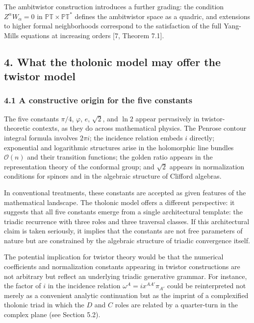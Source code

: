 \documentclass[
  11pt,
  letterpaper,
]{article}
\begin{document}
The ambitwistor construction introduces a further grading: the condition
\(Z^\alpha W_\alpha = 0\) in \(\mathbb{PT} \times \mathbb{PT}^*\)
defines the ambitwistor space as a quadric, and extensions to higher
formal neighborhoods correspond to the satisfaction of the full
Yang-Mills equations at increasing orders {[}7, Theorem 7.1{]}.

\subsection{4. What the tholonic model may offer the twistor
model}\label{what-the-tholonic-model-may-offer-the-twistor-model}

\subsubsection{4.1 A constructive origin for the five
constants}\label{a-constructive-origin-for-the-five-constants}

The five constants \(\pi/4\), \(\varphi\), \(e\), \(\sqrt{2}\), and
\(\ln 2\) appear pervasively in twistor-theoretic contexts, as they do
across mathematical physics. The Penrose contour integral formula
involves \(2\pi i\); the incidence relation embeds \(i\) directly;
exponential and logarithmic structures arise in the holomorphic line
bundles \(\mathcal{O}(n)\) and their transition functions; the golden
ratio appears in the representation theory of the conformal group; and
\(\sqrt{2}\) appears in normalization conditions for spinors and in the
algebraic structure of Clifford algebras.

In conventional treatments, these constants are accepted as given
features of the mathematical landscape. The tholonic model offers a
different perspective: it suggests that all five constants emerge from a
single architectural template: the triadic recurrence with three roles
and three traversal classes. If this architectural claim is taken
seriously, it implies that the constants are not free parameters of
nature but are constrained by the algebraic structure of triadic
convergence itself.

The potential implication for twistor theory would be that the numerical
coefficients and normalization constants appearing in twistor
constructions are not arbitrary but reflect an underlying triadic
generative grammar. For instance, the factor of \(i\) in the incidence
relation \(\omega^A = i x^{AA'} \pi_{A'}\) could be reinterpreted not
merely as a convenient analytic continuation but as the imprint of a
complexified tholonic triad in which the \(D\) and \(C\) roles are
related by a quarter-turn in the complex plane (see Section 5.2).
\end{document}
